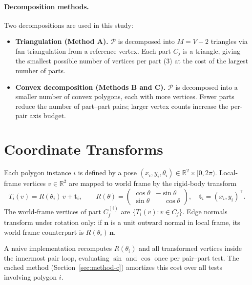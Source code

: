\paragraph{Decomposition methods.}
Two decompositions are used in this study:
\begin{itemize}
  \item \textbf{Triangulation (Method A).}
        $\mathcal{P}$ is decomposed into $M = V - 2$ triangles via
        fan triangulation from a reference vertex. Each part $C_j$ is
        a triangle, giving the smallest possible number of vertices per
        part (3) at the cost of the largest number of parts.
  \item \textbf{Convex decomposition (Methods B and C).}
        $\mathcal{P}$ is decomposed into a smaller number of convex
        polygons, each with more vertices. Fewer parts reduce the
        number of part--part pairs; larger vertex counts increase the
        per-pair axis budget.
\end{itemize}

\section{Coordinate Transforms}

Each polygon instance $i$ is defined by a pose
$(x_i, y_i, \theta_i) \in \mathbb{R}^2 \times [0, 2\pi)$.
Local-frame vertices $v \in \mathbb{R}^2$ are mapped to world frame by
the rigid-body transform
\[
  T_i(v) = R(\theta_i)\, v + \mathbf{t}_i,
  \qquad
  R(\theta) =
  \begin{pmatrix} \cos\theta & -\sin\theta \\
                  \sin\theta & \phantom{-}\cos\theta \end{pmatrix},
  \quad
  \mathbf{t}_i = (x_i, y_i)^\top.
\]
The world-frame vertices of part $C_j^{(i)}$ are
$\{T_i(v) : v \in C_j\}$.
Edge normals transform under rotation only: if $\mathbf{n}$ is a
unit outward normal in local frame, its world-frame counterpart is
$R(\theta_i)\,\mathbf{n}$.

A naive implementation recomputes $R(\theta_i)$ and all transformed
vertices inside the innermost pair loop, evaluating $\sin$ and $\cos$
once per pair--part test. The cached method (Section~\ref{sec:method-c})
amortizes this cost over all tests involving polygon $i$.

